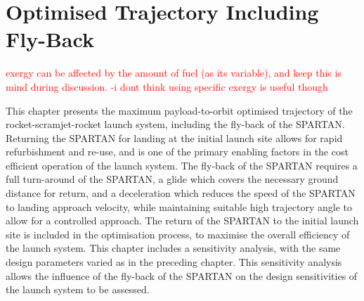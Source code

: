 
\cleardoublepage
\chapter{Optimised Trajectory Including Fly-Back}\label{chapter:Flyback}
\textcolor{red}{exergy can be affected by the amount of fuel (as its variable), and keep this is mind during discussion. -i dont think using specific exergy is  useful though}


This chapter presents the maximum payload-to-orbit optimised trajectory of the rocket-scramjet-rocket launch system, including the fly-back of the SPARTAN. 
 Returning the SPARTAN for landing at the initial launch site allows for rapid refurbishment and re-use, and is one of the primary enabling factors in the cost efficient operation of the launch system. 
The fly-back of the SPARTAN requires a full turn-around of the SPARTAN, a glide which covers the necessary ground distance for return, and a deceleration which reduces the speed of the SPARTAN to landing approach velocity, while maintaining suitable high trajectory angle to allow for a controlled approach. 
The return of the SPARTAN to the initial launch site is included in the optimisation process, to maximise the overall efficiency of the launch system. 
This chapter includes a sensitivity analysis, with the same design parameters varied as in the preceding chapter. This sensitivity analysis allows the influence of the fly-back of the SPARTAN on the design sensitivities of the launch system to be assessed.


